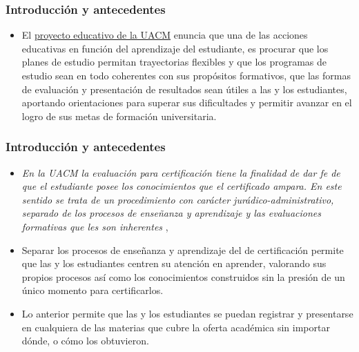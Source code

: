 \documentclass[xcolor=dvipsnames]{beamer}
\begin{document}
\begin{frame}\frametitle{Introducci\'on y antecedentes}


\begin{itemize}

\item El \href{https://drive.google.com/file/d/0B6AEksrqo4h1M2Q5OWVhOGEtODNlNy00M2M2LThkNTctZjE0ZjA4ZGJlZWZj/view?resourcekey=0-9eA5mzOWlPqKF8MTeYH9Iw}{proyecto educativo de la UACM} enuncia que una de las acciones educativas en funci\'on del aprendizaje del estudiante, es procurar que los planes de estudio permitan trayectorias flexibles y que los programas de estudio sean en todo coherentes con sus prop\'ositos formativos, que las formas de evaluaci\'on y presentaci\'on de resultados sean \'utiles a las y los estudiantes, aportando orientaciones  para superar sus dificultades y permitir avanzar en el logro de sus metas de formaci\'on universitaria.

\end{itemize}

\end{frame}


\begin{frame}\frametitle{Introducci\'on y antecedentes}
\begin{itemize}

\item \textit{En la UACM la evaluaci\'on para certificaci\'on tiene la finalidad de dar fe de que el estudiante posee los conocimientos que el certificado ampara. En este sentido se trata de un procedimiento con car\'acter jur\'adico-administrativo, separado de los procesos de ense\~nanza y aprendizaje y las evaluaciones formativas que les son inherentes} \cite{ProyectoEducativo}, 

\item Separar los procesos de ense\~nanza y aprendizaje del de certificaci\'on permite que las y los estudiantes centren su atenci\'on en aprender,  valorando sus propios procesos as\'i como los conocimientos construidos sin la presi\'on de un \'unico momento para certificarlos. 

\item Lo anterior permite que las y los estudiantes se puedan registrar y presentarse en cualquiera de las materias que cubre la oferta acad\'emica sin importar d\'onde, o c\'omo los obtuvieron. 



\end{itemize}
\end{frame}
\end{document}
